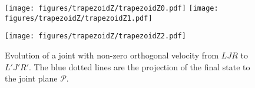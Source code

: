 \begin{wrapfigure}[14]{R}{0.6\textwidth}
\vspace*{-1.5em}
\graphicspath{{figures/trapezoidZ}}
    \centering
        \texttt{[image: figures/trapezoidZ/trapezoidZ0.pdf]}%
    \hfill
        \texttt{[image: figures/trapezoidZ/trapezoidZ1.pdf]}%

        \texttt{[image: figures/trapezoidZ/trapezoidZ2.pdf]}%
    \caption{
    Evolution of a joint with non-zero orthogonal velocity from $LJR$ to $L'J'R'$.
    The blue dotted lines are the projection of the final state to the joint plane $\mathcal P$.
    }
    \label{fig:trapezoidZ}
\end{wrapfigure}
